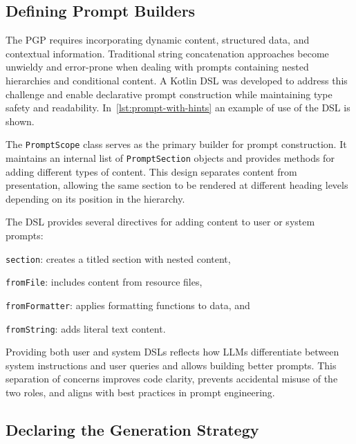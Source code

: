 \documentclass[12pt,a4paper,openright,twoside]{book}
\begin{document}
\subsection{Defining Prompt Builders}\label{sec:prompt-templates}

The \ac{PGP} requires incorporating dynamic content, structured data, and contextual information. 
%
Traditional string concatenation approaches become unwieldy and error-prone when dealing with prompts containing nested hierarchies and conditional content. 
%
A Kotlin \ac{DSL} was developed to address this challenge and enable declarative prompt construction while maintaining type safety and readability.
%
In~\cref{lst:prompt-with-hints} an example of use of the \ac{DSL} is shown.

The \texttt{PromptScope} class serves as the primary builder for prompt construction.
%
It maintains an internal list of \texttt{PromptSection} objects and provides methods for adding different types of content.
%
This design separates content from presentation, allowing the same section to be rendered at different heading levels depending on its position in the hierarchy.

The \ac{DSL} provides several directives for adding content to user or system prompts:
%
\begin{inlinelist}
    \item \texttt{section}: creates a titled section with nested content,
    \item \texttt{fromFile}: includes content from resource files,
    \item \texttt{fromFormatter}: applies formatting functions to data, and
    \item \texttt{fromString}: adds literal text content.
\end{inlinelist}
%
Providing both user and system \acp{DSL} reflects how \acp{LLM} differentiate between system instructions and user queries and allows building better prompts.
%
This separation of concerns improves code clarity, prevents accidental misuse of the two roles, and aligns with best practices in prompt engineering.



\subsection{Declaring the Generation Strategy}\label{sec:gen-strat}
\end{document}

